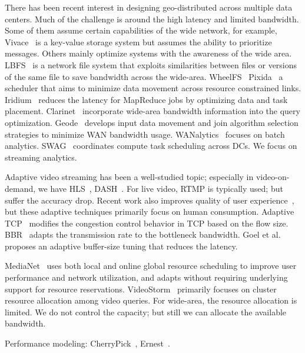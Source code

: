  There has been recent interest in designing
geo-distributed across multiple data centers. Much of the challenge is around
the high latency and limited bandwidth. Some of them assume certain capabilities
of the wide network, for example, Vivace~\cite{cho2012surviving} is a key-value
storage system but assumes the ability to prioritize messages. Others mainly
optimize systems with the awareness of the wide
area. LBFS~\cite{muthitacharoen2001low} is a network file system that exploits
similarities between files or versions of the same file to save bandwidth across
the wide-area. WheelFS~\cite{stribling2009flexible}
Pixida~\cite{kloudas2015pixida} a scheduler that aims to minimize data movement
across resource constrained links.  Iridium~\cite{pu2015low} reduces the latency
for MapReduce jobs by optimizing data and task
placement. Clarinet~\cite{viswanathan2016clarinet} incorporate wide-area
bandwidth information into the query
optimization. Geode~\cite{vulimiri2015global} develops input data movement and
join algorithm selection strategies to minimize WAN bandwidth
usage. WANalytics~\cite{vulimiri2015wananlytics} focuses on batch
analytics. SWAG~\cite{hung2015scheduling} coordinates compute task scheduling
across DCs. We focus on streaming analytics.


 Adaptive video streaming has been a
well-studied topic; especially in video-on-demand, we have
HLS~\cite{pantos2016http}, DASH~\cite{sodagar2011mpeg, michalos2012dynamic}. For
live video, RTMP is typically used; but suffer the accuracy drop. Recent work
also improves quality of user experience~\cite{yin2015control}, but these
adaptive techniques primarily focus on human consumption. Adaptive
TCP~\cite{wu2013adaptive} modifies the congestion control behavior in TCP based
on the flow size. BBR~\cite{cardwell2017bbr} adapts the transmission rate to the
bottleneck bandwidth. Goel et al.~\cite{goel2008low} proposes an adaptive
buffer-size tuning that reduces the latency.

 MediaNet~\cite{hicks2003user} uses both local
and online global resource scheduling to improve user performance and network
utilization, and adapts without requiring underlying support for resource
reservations. VideoStorm~\cite{zhang2017live} primarily focuses on cluster
resource allocation among video queries. For wide-area, the resource allocation
is limited. We do not control the capacity; but still we can allocate the
available bandwidth.

Performance modeling: CherryPick~\cite{alipourfard2017cherrypick},
Ernest~\cite{venkataraman2016ernest}.



